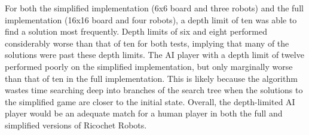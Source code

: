 \documentclass[a4paper,10pt]{article}
\begin{document}
  For both the simplified implementation (6x6 board and three robots) and the full implementation (16x16 board and four robots), a depth limit of ten was able to
  find a solution most frequently.  Depth limits of six and eight performed considerably worse than that of ten for both tests, implying that many of the solutions were
  past these depth limits.  The AI player with a depth limit of twelve performed poorly on the simplified implementation, but only marginally worse than that of ten in
  the full implementation.  This is likely because the algorithm wastes time searching deep into branches of the search tree when the solutions to the simplified game
  are closer to the initial state.  Overall, the depth-limited AI player would be an adequate match for a human player in both the full and simplified versions of
  Ricochet Robots.\\
\end{document}
